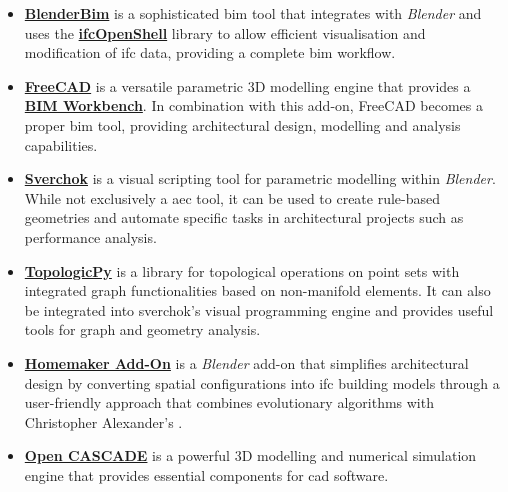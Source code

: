 \documentclass[a4paper, 12pt]{report}
\begin{document}
\begin{itemize}

\item \href{https://github.com/IfcOpenShell/IfcOpenShell/tree/v0.7.0/src/blenderbim}{\textbf{BlenderBim}} is a sophisticated \acrfull{bim} tool that integrates with \textit{Blender} and uses the \href{https://github.com/IfcOpenShell/IfcOpenShell}{\textbf{ifcOpenShell}} library to allow efficient visualisation and modification of \acrfull{ifc} data, providing a complete \acrshort{bim} workflow.

\item \href{https://github.com/FreeCAD/FreeCAD}{\textbf{FreeCAD}} is a versatile parametric 3D modelling engine that provides a \href{https://github.com/yorikvanhavre/BIM_Workbench}{\textbf{BIM Workbench}}. In combination with this add-on, FreeCAD becomes a proper \acrshort{bim} tool, providing architectural design, modelling and analysis capabilities.

\item \href{https://github.com/nortikin/sverchok}{\textbf{Sverchok}} is a visual scripting tool for parametric modelling within \textit{Blender}. While not exclusively a \acrshort{aec} tool, it can be used to create rule-based geometries and automate specific tasks in architectural projects such as performance analysis.

\item \href{https://github.com/wassimj/topologicpy}{\textbf{TopologicPy}} is a library for topological operations on point sets with integrated graph functionalities based on non-\gls{manifold} elements. It can also be integrated into sverchok's visual programming engine and provides useful tools for graph and geometry analysis.

\item \href{https://github.com/brunopostle/homemaker-addon}{\textbf{Homemaker Add-On}} is a \textit{Blender} add-on that simplifies architectural design by converting spatial configurations into \acrshort{ifc} building models through a user-friendly approach that combines evolutionary algorithms with Christopher Alexander's .

\item \href{https://github.com/tpaviot/oce}{\textbf{Open CASCADE}} is a powerful 3D modelling and numerical simulation engine that provides essential components for \acrshort{cad} software.

\end{itemize}
\end{document}
